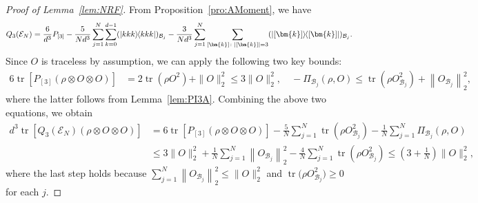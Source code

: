 \documentclass[aps,pra,twocolumn,nofootinbib,superscriptaddress,10pt]{revtex4-2}
\DeclarePairedDelimiter{\ket}{\lvert}{\rangle}
\DeclarePairedDelimiter{\bra}{\langle}{\rvert}
\newcommand{\ketbra}[2]{\ket{#1}\mkern-2mu\bra{#2}}
\newcommand{\proj}[1]{\ketbra{#1}{#1}}
\DeclareMathOperator{\tr}{tr}
\newcommand{\bmk}{\bm{k}}
\newcommand{\caB}{\mathcal{B}}
\newcommand{\caE}{\mathcal{E}}
\newcommand{\lref}[1]{Lemma~\ref{#1}}
\newcommand{\pref}[1]{Proposition~\ref{#1}}
\begin{document}
\begin{proof}[Proof of \lref{lem:NRF}]
From \pref{pro:AMoment}, we have
\begin{align}
    Q_3(\caE_N) = \frac{6}{d^3}P_{[3]} - \frac{5}{Nd^3}\sum_{j=1}^{N}\sum_{k=0}^{d-1}(\proj{kkk})_{\caB_j} - \frac{3}{Nd^3}\sum_{j=1}^{N}\sum_{[\bmk]\colon|[\bmk]|=3} (\proj{[\bmk]})_{\caB_j}.
\end{align}
Since $O$ is traceless by assumption, we can apply the following two key bounds:
\begin{align}
    6\tr\left[P_{[3]}\left(\rho\otimes O\otimes O\right)\right] &= 2\tr(\rho O^2) + \|O\|_2^2 \le 3\|O\|_2^2, \quad 
    -\Pi_{\caB_j}(\rho, O) \le \tr\left(\rho O_{\caB_j}^2\right) + \left\|O_{\caB_j}\right\|_2^2, 
\end{align}
where the latter follows from \lref{lem:PI3A}.
Combining the above two equations, we obtain
\begin{align}
    d^3\tr\left[Q_3(\caE_N)\left(\rho\otimes O\otimes O\right)\right] &= 6\tr\left[P_{[3]}\left(\rho\otimes O\otimes O\right)\right] - \frac{5}{N}\sum_{j=1}^N\tr\left(\rho O_{\caB_j}^2\right) - \frac{1}{N}\sum_{j=1}^N\Pi_{\caB_j}(\rho,O)\nonumber\\
    &\le 3\|O\|_2^2 + \frac{1}{N}\sum_{j=1}^N\left\|O_{\caB_j}\right\|_2^2 - \frac{4}{N}\sum_{j=1}^N\tr\left(\rho O_{\caB_j}^2\right)\le \left(3+\frac{1}{N}\right)\|O\|_2^2, \label{eq:P4rhoX}
\end{align}
where the last step holds because $\sum_{j=1}^N\left\|O_{\caB_j}\right\|_2^2 \le \|O\|_2^2$ and  $\tr\bigl(\rho O_{\caB_j}^2\bigr)\geq0$ for each $j$.
\end{proof}
\end{document}

